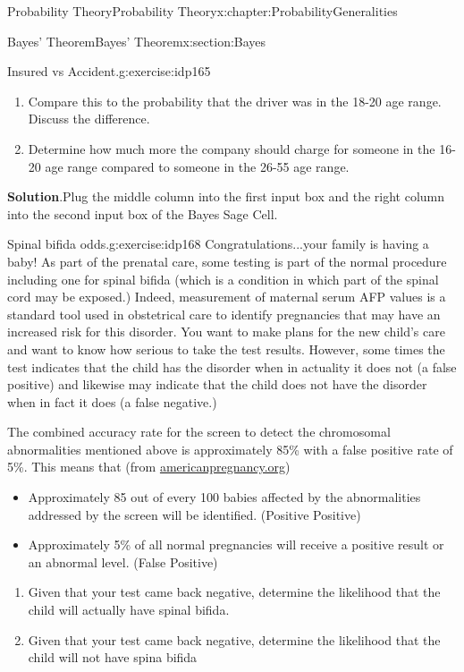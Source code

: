 \documentclass[oneside,10pt,]{book}
\newcommand{\blocktitlefont}{\relax}
\numberwithin{equation}{section}
\begin{document}
\begin{chapterptx}{Probability Theory}{}{Probability Theory}{}{}{x:chapter:ProbabilityGeneralities}
\begin{sectionptx}{Bayes' Theorem}{}{Bayes' Theorem}{}{}{x:section:Bayes}
\begin{inlineexercise}{Insured vs Accident.}{g:exercise:idp165}
\begin{enumerate}
\item{}Compare this to the probability that the driver was in the 18-20 age range. Discuss the difference.%
\item{}Determine how much more the company should charge for someone in the 16-20 age range compared to someone in the 26-55 age range.%
\end{enumerate}
%
\par\smallskip%
\noindent\textbf{\blocktitlefont Solution}.\hypertarget{g:solution:idp167}{}\quad{}Plug the middle column into the first input box and the right column into the second input box of the Bayes Sage Cell.%
\end{inlineexercise}%
\begin{inlineexercise}{Spinal bifida odds.}{g:exercise:idp168}%
Congratulations...your family is having a baby! As part of the prenatal care, some testing is part of the normal procedure including one for spinal bifida (which is a condition in which part of the spinal cord may be exposed.) Indeed, measurement of maternal serum AFP values is a standard tool used in obstetrical care to identify pregnancies that may have an increased risk for this disorder. You want to make plans for the new child's care and want to know how serious to take the test results. However, some times the test indicates that the child has the disorder when in actuality it does not (a false positive) and likewise may indicate that the child does not have the disorder when in fact it does (a false negative.)%
\par
The combined accuracy rate for the screen to detect the chromosomal abnormalities mentioned above is approximately 85\% with a false positive rate of 5\%. This means that (from \href{http://americanpregnancy.org/prenatal-testing/first-trimester-screen/}{americanpregnancy.org})%
\begin{itemize}[label=\textbullet]
\item{}Approximately 85 out of every 100 babies affected by the abnormalities addressed by the screen will be identified. (Positive Positive)%
\item{}Approximately 5\% of all normal pregnancies will receive a positive result or an abnormal level. (False Positive)%
\end{itemize}
%
\begin{enumerate}
\item{}Given that your test came back negative, determine the likelihood that the child will actually have spinal bifida.%
\item{}Given that your test came back negative, determine the likelihood that the child will not have spina bifida%

\end{enumerate}
\end{inlineexercise}
\end{sectionptx}
\end{chapterptx}
\end{document}
